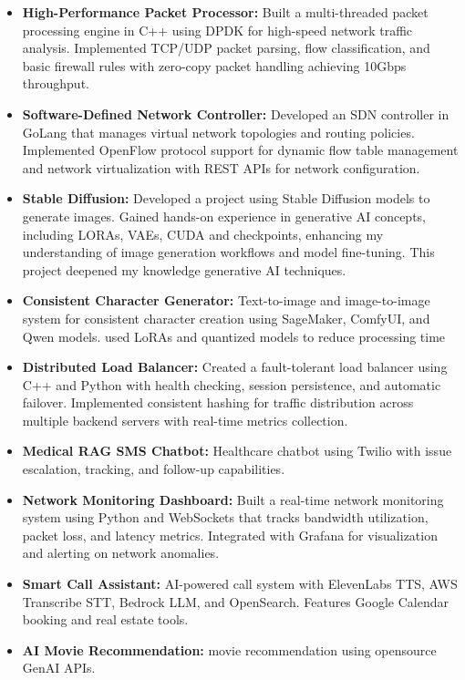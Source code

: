 

\begin{cventries}



 \begin{itemize}
 \item \textbf{High-Performance Packet Processor: } Built a multi-threaded packet processing engine in C++ using DPDK for high-speed network traffic analysis. Implemented TCP/UDP packet parsing, flow classification, and basic firewall rules with zero-copy packet handling achieving 10Gbps throughput.
 \item \textbf{Software-Defined Network Controller: } Developed an SDN controller in GoLang that manages virtual network topologies and routing policies. Implemented OpenFlow protocol support for dynamic flow table management and network virtualization with REST APIs for network configuration.
 \item \textbf{Stable Diffusion: } Developed a project using Stable Diffusion models to generate images. Gained hands-on experience in generative AI concepts, including LORAs, VAEs, CUDA and checkpoints, enhancing my understanding of image generation workflows and model fine-tuning. This project deepened my knowledge generative AI techniques.
 \item \textbf{Consistent Character Generator: } Text-to-image and image-to-image system for consistent character creation using SageMaker, ComfyUI, and Qwen models. used LoRAs and quantized models to reduce processing time
 \item \textbf{Distributed Load Balancer: } Created a fault-tolerant load balancer using C++ and Python with health checking, session persistence, and automatic failover. Implemented consistent hashing for traffic distribution across multiple backend servers with real-time metrics collection.
 \item \textbf{Medical RAG SMS Chatbot: } Healthcare chatbot using Twilio with issue escalation, tracking, and follow-up capabilities.
 \item \textbf{Network Monitoring Dashboard: } Built a real-time network monitoring system using Python and WebSockets that tracks bandwidth utilization, packet loss, and latency metrics. Integrated with Grafana for visualization and alerting on network anomalies.
 \item \textbf{Smart Call Assistant: } AI-powered call system with ElevenLabs TTS, AWS Transcribe STT, Bedrock LLM, and OpenSearch. Features Google Calendar booking and real estate tools.
 \item  \textbf{AI Movie Recommendation: }movie recommendation using opensource GenAI APIs.

 \end{itemize}


\end{cventries}
